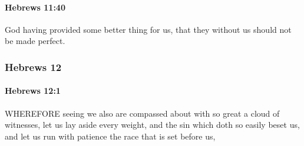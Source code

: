		\paragraph{Hebrews 11:40} %
			\label{HEBREWS-11-40}

			God having provided some better thing for us, that they without us should not be made perfect.

			\begin{framed}
			\scriptsize
				\begin{compactdesc}
					\item[SBLG] 
				\end{compactdesc}
			\end{framed}

	\subsubsection{Hebrews 12} %
		\label{HEBREWS-12}
		
		\paragraph{Hebrews 12:1} %
			\label{HEBREWS-12-1}
			
			WHEREFORE seeing we also are compassed about with so great a cloud of witnesses, let us lay aside every weight, and the sin which doth so easily beset us, and let us run with patience the race that is set before us,
			
